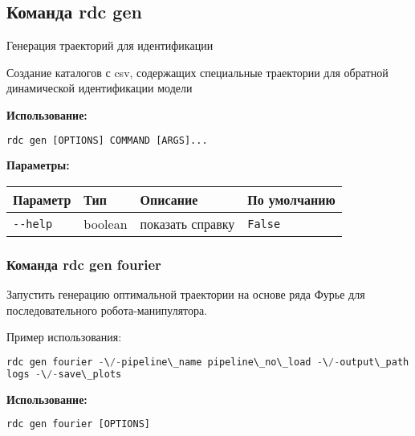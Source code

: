 \hypertarget{rdc-gen}{%
\subsection{Команда rdc gen}\label{rdc-gen}}

Генерация траекторий для идентификации

Создание каталогов с csv, содержащих специальные траектории для обратной динамической идентификации модели

\textbf{Использование:}
\begin{lstlisting}[language=python, numbers=none, frame=single]
rdc gen [OPTIONS] COMMAND [ARGS]...
\end{lstlisting}

\textbf{Параметры:}
\begin{center}
\fontsize{10pt}{10pt}\selectfont
\begin{longtable}[]{p{5cm}|p{2cm}|p{3.5cm}|p{5cm}}
    \hline
\toprule()
Параметр & Тип & Описание & По умолчанию \\
\hline
\midrule()
\endhead
\texttt{-\/-help} & boolean & показать справку &
\texttt{False} \\
\bottomrule()
\hline
\end{longtable}
\end{center}

\hypertarget{rdc-gen-fourier}{%
\subsubsection{ Команда rdc gen fourier}\label{rdc-gen-fourier}}

Запустить генерацию оптимальной траектории на основе ряда Фурье для последовательного робота-манипулятора.

Пример использования:
\begin{lstlisting}[language=python, numbers=none, frame=single]
rdc gen fourier -\/-pipeline\_name pipeline\_no\_load -\/-output\_path
logs -\/-save\_plots
\end{lstlisting}

\textbf{Использование:}
\begin{lstlisting}[language=python, numbers=none, frame=single]
rdc gen fourier [OPTIONS]
\end{lstlisting}

